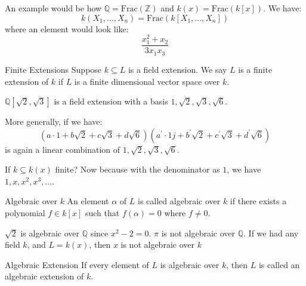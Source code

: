 \documentclass{report}
\begin{document}
An example would be how $\mathbb{Q} = \text{Frac}(\mathbb{Z})$ and $k(x) = \text{Frac}(k[x])$. We have:
    \begin{equation*}
        k(X_{1}, \ldots, X_{n}) = \text{Frac}(k[X_{1}, \ldots, X_{n}]) 
    \end{equation*}
where an element would look like:
    \begin{equation*}
        \dfrac{x_{1}^{2} + x_{2}}{3x_{1}x_{3}}
    \end{equation*}

\begin{definition}{Finite Extensions}
    Suppose $k \subseteq L$ is a field extension. We say $L$ is a finite extension of $k$ if $L$ is a finite dimensional vector space over $k$.
\end{definition}

\begin{examples}
    \begin{example}
        $\mathbb{Q}[\sqrt{2}, \sqrt{3}]$ is a field extension with a basis $1, \sqrt{2}, \sqrt{3}, \sqrt{6}$.
    \end{example}
\end{examples}

More generally, if we have:
    \begin{equation*}
        (a \cdot 1 + b\sqrt{2} + c \sqrt{3} + d\sqrt{6})(a^{\prime} \cdot 1j + b^{\prime} \sqrt{2} + c^{\prime} \sqrt{3} + d^{\prime} \sqrt{6})
    \end{equation*}
is again a linear combination of $1,\sqrt{2}, \sqrt{3}, \sqrt{6}$.

If $k \subseteq k(x)$ finite? Now because with the denominator as $1$, we have $1, x, x^{2}, x^{3}, \ldots$.

\begin{definition}{Algebraic over $k$}
    An element $\alpha$ of $L$ is called algebraic over $k$ if there exists a polynomial $f \in k[x]$ such that $f(\alpha) = 0$ where $f \neq 0$.
\end{definition}

\begin{examples}
    \begin{example}
        $\sqrt{2}$ is algebraic over $\mathbb{Q}$ since $x^{2} - 2 = 0$. $\pi$ is not algebraic over $\mathbb{Q}$. If we had any field $k$, and $L = k(x)$, then $x$ is not algebraic over $k$
    \end{example}
\end{examples}

\begin{definition}{Algebraic Extension}
    If every element of $L$ is algebraic over $k$, then $L$ is called an algebraic extension of $k$.
\end{definition}
\end{document}
